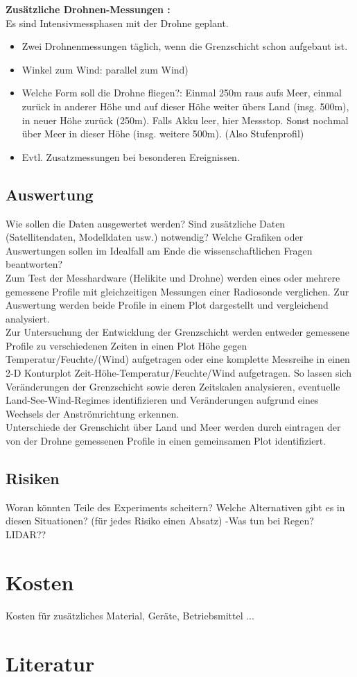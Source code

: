 \documentclass[a4paper,11pt,DIV=calc,tablecaptionabove,headinclude,twoside]{article}
\begin{document}
\textbf{Zusätzliche Drohnen-Messungen :}\\
Es sind Intensivmessphasen mit der Drohne geplant.
\begin{itemize}
\item Zwei Drohnenmessungen täglich, wenn die Grenzschicht schon aufgebaut ist.
\item Winkel zum Wind: parallel zum Wind)
\item Welche Form soll die Drohne fliegen?: Einmal 250m raus aufs Meer, einmal zurück in anderer Höhe und auf dieser Höhe weiter übers Land (insg. 500m), in neuer Höhe zurück (250m). Falls Akku leer, hier Messstop. Sonst nochmal über Meer in dieser Höhe (insg. weitere 500m). (Also Stufenprofil)
\item Evtl. Zusatzmessungen bei besonderen Ereignissen.
\end{itemize}
\subsection{Auswertung}
Wie sollen die Daten ausgewertet werden? Sind zusätzliche Daten (Satellitendaten, Modelldaten usw.) notwendig? Welche Grafiken oder Auswertungen sollen im Idealfall am Ende die wissenschaftlichen Fragen beantworten?\\
Zum Test der Messhardware (Helikite und Drohne) werden eines oder mehrere gemessene Profile 
mit gleichzeitigen Messungen einer Radiosonde verglichen. Zur Auswertung werden beide Profile
in einem Plot dargestellt und vergleichend analysiert.\\
Zur Untersuchung der Entwicklung der Grenzschicht werden entweder gemessene Profile zu verschiedenen 
Zeiten in einen Plot Höhe gegen Temperatur/Feuchte/(Wind) aufgetragen oder eine komplette Messreihe in einen 
2-D Konturplot Zeit-Höhe-Temperatur/Feuchte/Wind aufgetragen. So lassen sich Veränderungen der Grenzschicht sowie
deren Zeitskalen analysieren, eventuelle Land-See-Wind-Regimes identifizieren und Veränderungen aufgrund eines 
Wechsels der Anströmrichtung erkennen.\\
Unterschiede der Grenschicht über Land und Meer werden durch eintragen der von der Drohne gemessenen Profile 
in einen gemeinsamen Plot identifiziert.\\

\subsection{Risiken}
Woran könnten Teile des Experiments scheitern? Welche Alternativen gibt es in diesen Situationen? (für jedes Risiko einen Absatz)
-Was tun bei Regen? LIDAR??
\section{Kosten}
Kosten für zusätzliches Material, Geräte, Betriebsmittel ...

\section*{Literatur}

\end{document}

